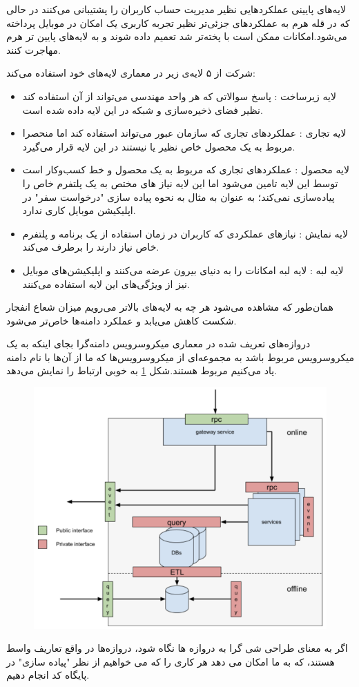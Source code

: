 لایه‌های پایینی عملکرد‌هایی نظیر مدیریت حساب کاربران را پشتیبانی می‌کنند در حالی که در قله هرم به عملکرد‌های جزئی‌تر نظیر تجربه کاربری یک امکان در موبایل پرداخته می‌شود.امکانات ممکن است با پخته‌تر شد تعمیم داده شوند و به لایه‌های پایین تر هرم مهاجرت کنند.

شرکت  از ۵ لایه‌ی زیر در معماری لایه‌های خود استفاده می‌کند:
\begin{itemize}
\item
لایه زیرساخت : پاسخ سوالاتی که هر واحد مهندسی می‌تواند از آن استفاده کند نظیر فضای ذخیره‌سازی و شبکه در این لایه داده شده است.
\item
لایه تجاری : عملکرد‌های تجاری که سازمان عبور می‌تواند استفاده کند اما منحصرا مربوط به یک محصول خاص نظیر  یا  نیستند در این لایه قرار می‌گیرد.
\item
لایه محصول  : عملکرد‌های تجاری که مربوط به یک محصول و خط کسب‌و‌کار است توسط این لایه تامین می‌شود اما این لایه نیاز های مختص به یک پلتفرم خاص را پیاده‌سازی نمی‌کند؛ به عنوان به مثال به نحوه پیاده سازی "درخواست سفر" در اپلیکیشن موبایل کاری ندارد.
\item
لایه نمایش  : نیاز‌های عملکردی که کاربران در زمان استفاده از یک برنامه و پلتفرم خاص نیاز دارند را برطرف می‌کند.
\item
لایه لبه  : لایه لبه امکانات  را به دنیای بیرون عرضه می‌کنند و اپلیکیشن‌های موبایل نیز از ویژگی‌های این لایه استفاده می‌کنند.
\end{itemize}

همان‌طور که مشاهده می‌شود هر چه به لایه‌های بالاتر می‌رویم میزان شعاع انفجار شکست کاهش می‌یابد و عملکرد دامنه‌ها خاص‌تر می‌شود.

دروازه‌های تعریف شده در معماری میکروسرویس دامنه‌گرا بجای اینکه به یک میکروسرویس مربوط باشد به مجموعه‌ای از میکروسرویس‌ها که ما از آن‌ها با نام دامنه یاد می‌کنیم مربوط هستند.شکل \ref{fig:gateways} به خوبی ارتباط را نمایش می‌دهد.‍

\begin{figure}[h]
\label{fig:gateways}
\centering
\includegraphics[scale=0.5]{gateways.png}
\end{figure}

اگر به معنای طراحی شی گرا به دروازه ها نگاه شود، دروازه‌ها در واقع تعاریف واسط هستند، که به ما امکان می دهد هر کاری را که می خواهیم از نظر "پیاده سازی" در پایگاه کد انجام دهیم.


